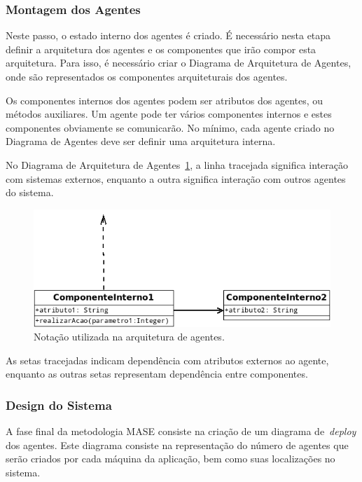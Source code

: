 \subsubsection{Montagem dos Agentes}

Neste passo, o estado interno dos agentes é criado. É necessário nesta etapa definir a arquitetura dos agentes e os componentes que irão compor esta arquitetura. Para isso, é necessário criar o Diagrama de Arquitetura de Agentes, onde são representados os componentes arquiteturais dos agentes.

Os componentes internos dos agentes podem ser atributos dos agentes, ou métodos auxiliares. Um agente pode ter vários componentes internos e estes componentes obviamente se comunicarão. No mínimo, cada agente criado no Diagrama de Agentes deve ser definir uma arquitetura interna.

No Diagrama de Arquitetura de Agentes~\ref{fig:exemplo-diagrama-arquitetura-agentes}, a linha tracejada significa interação com sistemas externos, enquanto a outra significa interação com outros agentes do sistema.

\begin{figure}
	\centering
	\includegraphics[scale=0.65]{images/exemplo-diagrama-arquitetura-agentes.png}
	\caption{Notação utilizada na arquitetura de agentes.}
	\label{fig:exemplo-diagrama-arquitetura-agentes}
\end{figure}

As setas tracejadas indicam dependência com atributos externos ao agente, enquanto as outras setas representam dependência entre componentes.

\subsubsection{Design do Sistema}

A fase final da metodologia MASE consiste na criação de um diagrama de~\emph{deploy} dos agentes. Este diagrama consiste na representação do número de agentes que serão criados por cada máquina da aplicação, bem como suas localizações no sistema.

